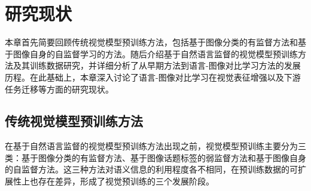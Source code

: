 \chapter{研究现状}
本章首先简要回顾传统视觉模型预训练方法，包括基于图像分类的有监督方法和基于图像自身的自监督学习的方法。随后介绍基于自然语言监督的视觉模型预训练方法及其训练数据研究，并详细分析了从早期方法到语言-图像对比学习方法的发展历程。在此基础上，本章深入讨论了语言-图像对比学习在视觉表征增强以及下游任务迁移等方面的研究现状。


\section{传统视觉模型预训练方法}
\label{sec:pt-related}

在基于自然语言监督的视觉模型预训练方法出现之前，视觉模型预训练主要分为三类：基于图像分类的有监督方法、基于图像话题标签的弱监督方法和基于图像自身的自监督方法。这三种方法对语义信息的利用程度各不相同，在预训练数据的可扩展性上也存在差异，形成了视觉预训练的三个发展阶段。 %


